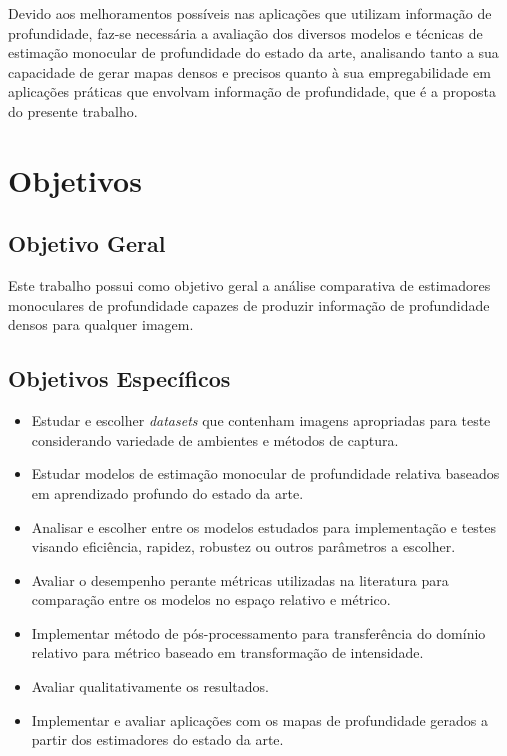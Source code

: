 Devido aos melhoramentos possíveis nas aplicações que utilizam informação de profundidade, faz-se necessária a avaliação dos diversos modelos e técnicas de estimação monocular de profundidade do estado da arte, analisando tanto a sua capacidade de gerar mapas densos e precisos quanto à sua empregabilidade em aplicações práticas que envolvam informação de profundidade, que é a proposta do presente trabalho.

 
\section{Objetivos}


\subsection{Objetivo Geral}
Este trabalho possui como objetivo geral a análise comparativa de estimadores monoculares de profundidade capazes de produzir informação de profundidade densos para qualquer imagem.

\subsection{Objetivos Específicos}

\begin{itemize}
    \item Estudar e escolher \textit{datasets} que contenham imagens apropriadas para teste considerando variedade de ambientes e métodos de captura.
    \item Estudar modelos de estimação monocular de profundidade relativa baseados em aprendizado profundo do estado da arte.
    \item Analisar e escolher entre os modelos estudados para implementação e testes visando eficiência, rapidez, robustez ou outros parâmetros a escolher.
    \item Avaliar o desempenho perante métricas utilizadas na literatura para comparação entre os modelos no espaço relativo e métrico.
    \item Implementar método de pós-processamento para transferência do domínio relativo para métrico baseado em transformação de intensidade.
    \item Avaliar qualitativamente os resultados.
    \item Implementar e avaliar aplicações com os mapas de profundidade gerados a partir dos estimadores do estado da arte.
    
\end{itemize}



